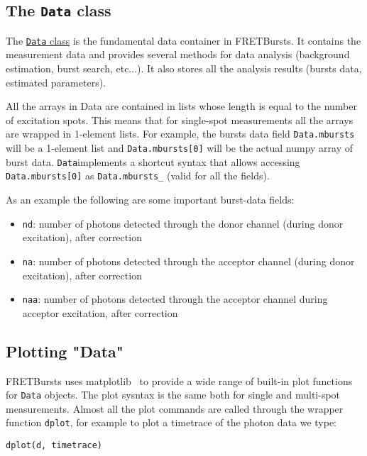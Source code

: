 \subsection{The \texttt{Data} class}
\label{sec:data_intro}

The \href{http://fretbursts.readthedocs.org/en/latest/data_class.html}{\texttt{Data} class} is the fundamental data container in FRETBursts. It contains the measurement data and provides several methods for data analysis (background estimation, burst search, etc...). It also stores all the analysis results (bursts data, estimated parameters).

All the arrays in Data are contained in lists whose length is equal to the number of excitation spots. This means that for single-spot measurements all the arrays are wrapped in 1-element lists. For example, the bursts data field \verb|Data.mbursts| will be a 1-element list and \verb|Data.mbursts[0]| will be the actual numpy array of burst data. \verb|Data|implements a shortcut syntax that allows accessing 
\verb|Data.mbursts[0]| as \verb|Data.mbursts_| (valid for all the fields).

As an example the following are some important burst-data fields:

\begin{itemize}
\item \verb|nd|: number of photons detected through the donor channel (during donor excitation), after correction
\item \verb|na|: number of photons detected through the acceptor channel (during donor excitation), after correction
\item \verb|naa|: number of photons detected through the acceptor channel during acceptor excitation, after correction
\end{itemize}

\subsection{Plotting "Data"}

FRETBursts uses matplotlib~\cite{2096e2a4-8f50-4519-bfb3-f796da201630} to provide a wide range of built-in plot functions for \verb|Data| objects. The plot sysntax is the same both for single and multi-spot measurements. Almost all the plot commands are called through the wrapper function \verb|dplot|, for example to plot a timetrace of the photon data we type:

\begin{verbatim}
dplot(d, timetrace)
\end{verbatim}

